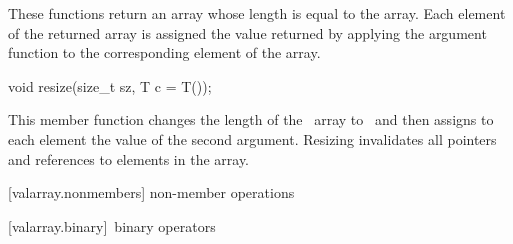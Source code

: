 \documentclass[american,twoside]{book}
\begin{document}
\begin{paras}
\begin{itemdescr}
\pnum
These functions return an array whose length is equal to the array.
Each element of the returned array is assigned
the value returned by applying the argument function to the
corresponding element of the array.

%
\begin{itemdecl}
void resize(size_t sz, T c = T());
\end{itemdecl}

\pnum
This member function changes the length of the
\
array to
\
and then assigns to each element the value of the second argument.
Resizing invalidates all pointers and references to elements in the array.
\end{itemdescr}

[valarray.nonmembers]{ non-member operations}

\rSec3[valarray.binary]{\tcode{valarray}\ binary operators}


\end{paras}
\end{document}
